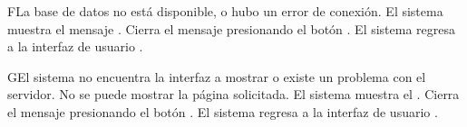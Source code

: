 
\begin{UCtrayectoriaA}{F}{La base de datos no está disponible, o hubo un error de conexión.}
    \UCpaso El sistema muestra el mensaje .
    \UCpaso[\UCactor] Cierra el mensaje presionando el botón .
    \UCpaso El sistema regresa a la interfaz de usuario .
\end{UCtrayectoriaA}

\begin{UCtrayectoriaA}{G}{El sistema no encuentra la interfaz a mostrar o existe un problema con el servidor.}
    \UCpaso No se puede mostrar la página solicitada.
    \UCpaso El sistema muestra el .
    \UCpaso[\UCactor] Cierra el mensaje presionando el botón .
    \UCpaso El sistema regresa a la interfaz de usuario .
\end{UCtrayectoriaA}
